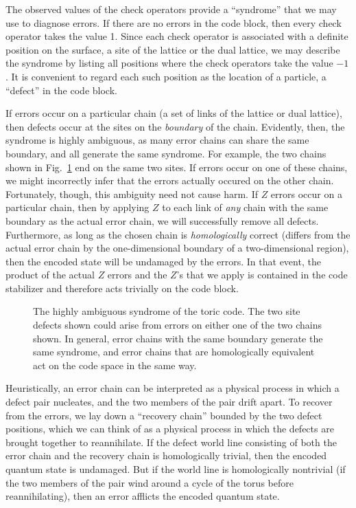 The observed values of the check operators provide a ``syndrome'' that we may use to diagnose errors. If there are no errors in the code block, then every check operator takes the value 1. Since each check operator is associated with a definite position on the surface, a site of the lattice or the dual lattice, we may describe the syndrome by listing all positions where the check operators take the value $-1$. It is convenient to regard each such position as the location of a particle, a ``defect'' in the code block.

If errors occur on a particular chain (a set of links of the lattice or dual lattice), then defects occur at the sites on the {\em boundary} of the chain. Evidently, then, the syndrome is highly ambiguous, as many error chains can share the same boundary, and all generate the same syndrome. For example, the two chains shown in Fig.~\ref{fig_defect} end on the same two sites.  If errors occur on one of these chains, we might incorrectly infer that the errors actually occured on the other chain.  Fortunately, though, this ambiguity need not cause harm.  If $Z$ errors occur on a particular chain, then by applying $Z$ to each link of {\em any} chain with the same boundary as the actual error chain, we will successfully remove all defects. Furthermore, as long as the chosen chain is {\em homologically} correct (differs from the actual error chain by the one-dimensional boundary of a two-dimensional region), then the encoded state will be undamaged by the errors.  In that event, the product of the actual $Z$ errors and the $Z$'s that we apply is contained in the code stabilizer and therefore acts trivially on the code block. 

\begin{figure}
\begin{center}
\leavevmode
\epsfxsize=3in
\end{center}
\caption{The highly ambiguous syndrome of the toric code. The two site defects shown could arise from errors on either one of the two chains shown. In general, error chains with the same boundary generate the same syndrome, and error chains that are homologically equivalent act on the code space in the same way.}
\label{fig_defect}
\end{figure}


Heuristically, an error chain can be interpreted as a physical process in which a defect pair nucleates, and the two members of the pair drift apart. To recover from the errors, we lay down a ``recovery chain'' bounded by the two defect positions, which we can think of as a physical process in which the defects are brought together to reannihilate. If the defect world line consisting of both the error chain and the recovery chain is homologically trivial, then the encoded quantum state is undamaged. But if the world line is homologically nontrivial (if the two members of the pair wind around a cycle of the torus before reannihilating), then an error afflicts the encoded quantum state.


